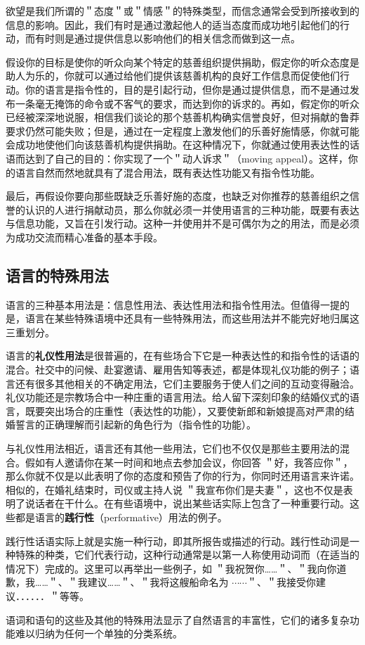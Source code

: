 欲望是我们所谓的＂态度＂或＂情感＂的特殊类型，而信念通常会受到所接收到的信息的影响。因此，我们有时是通过激起他人的适当态度而成功地引起他们的行动，而有时则是通过提供信息以影响他们的相关信念而做到这一点。

假设你的目标是使你的听众向某个特定的慈善组织提供捐助，假定你的听众态度是助人为乐的，你就可以通过给他们提供该慈善机构的良好工作信息而促使他们行动。你的语言是指令性的，目的是引起行动，但你是通过提供信息，而不是通过发布一条毫无掩饰的命令或不客气的要求，而达到你的诉求的。再如，假定你的听众已经被深深地说服，相信我们谈论的那个慈善机构确实信誉良好，但对捐献的鲁莽要求仍然可能失败；但是，通过在一定程度上激发他们的乐善好施情感，你就可能会成功地使他们向该慈善机构提供捐助。在这种情况下，你就通过使用表达性的话语而达到了自己的目的：你实现了一个＂动人诉求＂（moving appeal）。这样，你的语言自然而然地就具有了混合用法，既有表达性功能又有指令性功能。

最后，再假设你要向那些既缺乏乐善好施的态度，也缺乏对你推荐的慈善组织之信誉的认识的人进行捐献动员，那么你就必须一并使用语言的三种功能，既要有表达与信息功能，又旨在引发行动。这种一并使用并不是可偶尔为之的用法，而是必须为成功交流而精心准备的基本手段。

\subsection{语言的特殊用法}

语言的三种基本用法是：信息性用法、表达性用法和指令性用法。但值得一提的是，语言在某些特殊语境中还具有一些特殊用法，而这些用法并不能完好地归属这三重划分。

语言的\textbf{礼仪性用法}是很普遍的，在有些场合下它是一种表达性的和指令性的话语的混合。社交中的问候、赴宴邀请、雇用告知等表述，都是体现礼仪功能的例子；语言还有很多其他相关的不确定用法，它们主要服务于使人们之间的互动变得融洽。礼仪功能还是宗教场合中一种庄重的语言用法。给人留下深刻印象的结婚仪式的语言，既要突出场合的庄重性（表达性的功能），又要使新郎和新娘提高对严肃的结婚誓言的正确理解而引起新的角色行为（指令性的功能）。

与礼仪性用法相近，语言还有其他一些用法，它们也不仅仅是那些主要用法的混合。假如有人邀请你在某一时间和地点去参加会议，你回答 ＂好，我答应你＂，那么你就不仅是以此表明了你的态度和预告了你的行为，你同时还用语言来许诺。相似的，在婚礼结束时，司仪或主持人说 ＂我宣布你们是夫妻＂，这也不仅是表明了说话者在干什么。在有些语境中，说出某些话实际上包含了一种重要行动。这些都是语言的\textbf{践行性}（performative）用法的例子。

践行性话语实际上就是实施一种行动，即其所报告或描述的行动。践行性动词是一种特殊的种类，它们代表行动，这种行动通常是以第一人称使用动词而（在适当的情况下）完成的。这里可以再举出一些例子，如 ＂我祝贺你……＂、＂我向你道歉，我……＂、＂我建议……＂、＂我将这艘船命名为 $\cdots \cdots$＂、＂我接受你建议．．．．．．＂等等。

语词和语句的这些及其他的特殊用法显示了自然语言的丰富性，它们的诸多复杂功能难以归纳为任何一个单独的分类系统。

